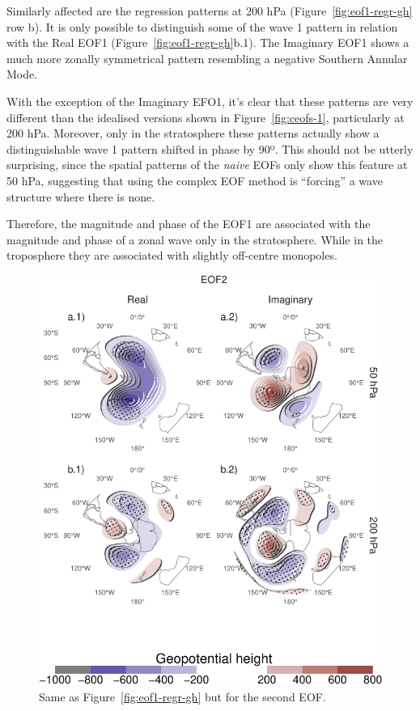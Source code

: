 \documentclass[smallextended]{svjour3}       %
\begin{document}
Similarly affected are the regression patterns at 200 hPa (Figure~\ref{fig:eof1-regr-gh} row b). It is only possible to distinguish some of the wave 1 pattern in relation with the Real EOF1 (Figure~\ref{fig:eof1-regr-gh}b.1). The Imaginary EOF1 shows a much more zonally symmetrical pattern resembling a negative Southern Annular Mode.

With the exception of the Imaginary EFO1, it's clear that these patterns are very different than the idealised versions shown in Figure~\ref{fig:ceofs-1}, particularly at 200 hPa. Moreover, only in the stratosphere these patterns actually show a distinguishable wave 1 pattern shifted in phase by 90º. This should not be utterly surprising, since the spatial patterns of the \emph{naive} EOFs only show this feature at 50 hPa, suggesting that using the complex EOF method is ``forcing'' a wave structure where there is none.

Therefore, the magnitude and phase of the EOF1 are associated with the magnitude and phase of a zonal wave only in the stratosphere. While in the troposphere they are associated with slightly off-centre monopoles.



\begin{figure}
\centering
\includegraphics{../figures/eof2-regr-gh-1.pdf}
\caption{\label{fig:eof2-regr-gh}Same as Figure~\ref{fig:eof1-regr-gh} but for the second EOF.}
\end{figure}
\end{document}
